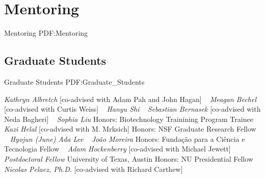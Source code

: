 \section
{Mentoring}
{Mentoring}
{PDF:Mentoring}

\subsection
{Graduate Students}
{Graduate Students}
{PDF:Graduate_Students}

\GapNoBreak
{}
\textit{Kathryn Albretch}
    [co-advised with Adam Pah and John Hagan]
\newline
~
\Gap{}
\textit{Meagan Bechel}
    [co-advised with Curtis Weiss]
\newline
~
\Gap{}
\textit{Hanyu Shi}
\newline
~
\Gap{}
\textit{Sebastian Bernasek}
    [co-advised with Neda Bagheri]
\newline
~
\Gap{}
\textit{Sophia Liu}
\newline
    {\footnotesize Honors: Biotechnology Trainining Program Trainee}
    \newline
~
\Gap{}
\textit{Kazi Helal}
    [co-advised with M. Mrksich]
\newline
    {\footnotesize Honors: NSF Graduate Research Fellow}
    \newline
~
\Gap{}
\textit{Hyojun (June) Ada Lee}
\newline
~
\Gap{}
\textit{Jo\~ao Moreira}
\newline
    {\footnotesize Honors: Funda\c{c}\~ao para a Ci\^encia e Tecnologia Fellow}
    \newline
~
\Gap{}
\textit{Adam Hockenberry}
    [co-advised with Michael Jewett]
\newline
    \textit{Postdoctoral Fellow}
    \newline
    University of Texas, Austin
    \newline
    {\footnotesize Honors: NU Presidential Fellow}
    \newline
~
\Gap{}
\textit{Nicolas Pelaez, Ph.D.}
    [co-advised with Richard Carthew]
